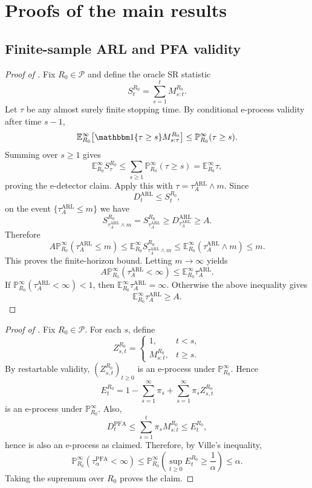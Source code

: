 \documentclass[12pt]{article}
\theoremstyle{spaced}
\theoremstyle{remark}
\newcommand{\calP}{\mathcal P}
\newcommand{\ind}{\mathbbm 1}
\newcommand{\Pinf}[1]{\mathbb P_{#1}^{\infty}}
\newcommand{\Einf}[1]{\mathbb E_{#1}^{\infty}}
\begin{document}
\section{Proofs of the main results}\label{app:main-proofs}

\subsection{Finite-sample ARL and PFA validity}\label{app:proof-validity}

\begin{proof}[Proof of ]
Fix $R_0\in\calP$ and define the oracle SR statistic
\[
  S_t^{R_0}=\sum_{s=1}^t  M_{s:t}^{R_0}.
\]
Let $\tau$ be any almost surely finite stopping time.  By conditional e-process validity after time $s-1$,
\[
  \Einf{R_0}\!\left[\ind\{\tau\ge s\}M_{s:\tau}^{R_0}\right]
  \le
  \Pinf{R_0}(\tau\ge s).
\]
Summing over $s\ge1$ gives
\[
  \Einf{R_0}S_\tau^{R_0}
  \le
  \sum_{s\ge1}\Pinf{R_0}(\tau\ge s)
  =
  \Einf{R_0}\tau,
\]
proving the e-detector claim.
Apply this with $\tau=\tau_A^{\mathrm{ARL}}\wedge m$.  Since
\[
  D_t^{\mathrm{ARL}}\le S_t^{R_0},
\]
on the event $\{\tau_A^{\mathrm{ARL}}\le m\}$ we have
\[
  S_{\tau_A^{\mathrm{ARL}}\wedge m}^{R_0}
  =S_{\tau_A^{\mathrm{ARL}}}^{R_0}
  \ge D_{\tau_A^{\mathrm{ARL}}}^{\mathrm{ARL}}
  \ge A.
\]
Therefore
\[
  A\Pinf{R_0}(\tau_A^{\mathrm{ARL}}\le m)
  \le
  \Einf{R_0}S_{\tau_A^{\mathrm{ARL}}\wedge m}^{R_0}
  \le
  \Einf{R_0}(\tau_A^{\mathrm{ARL}}\wedge m)
  \le m.
\]
This proves the finite-horizon bound.  Letting $m\to\infty$ yields
\[
  A\Pinf{R_0}(\tau_A^{\mathrm{ARL}}<\infty)
  \le
  \Einf{R_0}\tau_A^{\mathrm{ARL}}.
\]
If $\Pinf{R_0}(\tau_A^{\mathrm{ARL}}<\infty)<1$, then $\Einf{R_0}\tau_A^{\mathrm{ARL}}=\infty$.  Otherwise the above inequality gives $$\Einf{R_0}\tau_A^{\mathrm{ARL}}\ge A.$$
\end{proof}


\begin{proof}[Proof of ]
Fix $R_0\in\calP$.  For each $s$, define
\[
  Z_{s,t}^{R_0}=\begin{cases}
  1, & t<s,\\
  M_{s:t}^{R_0}, & t\ge s.
  \end{cases}
\]
By restartable validity, $(Z_{s,t}^{R_0})_{t\ge0}$ is an e-process under $\Pinf{R_0}$.  Hence
\[
  E_t^{R_0}
  =1-\sum_{s=1}^\infty\pi_s+
  \sum_{s=1}^\infty\pi_s Z_{s,t}^{R_0}
\]
is an e-process under $\Pinf{R_0}$.  Also,
\[
  D_t^{\mathrm{PFA}}
  \le
  \sum_{s=1}^t \pi_sM_{s:t}^{R_0}
  \le
  E_t^{R_0},
\]
hence is also an e-process as claimed.
Therefore, by Ville's inequality,
\[
  \Pinf{R_0}(\tau_\alpha^{\mathrm{PFA}}<\infty)
  \le
  \Pinf{R_0}\left(\sup_{t\ge0}E_t^{R_0}\ge\frac1\alpha\right)
  \le \alpha.
\]
Taking the supremum over $R_0$ proves the claim.
\end{proof}
\end{document}
